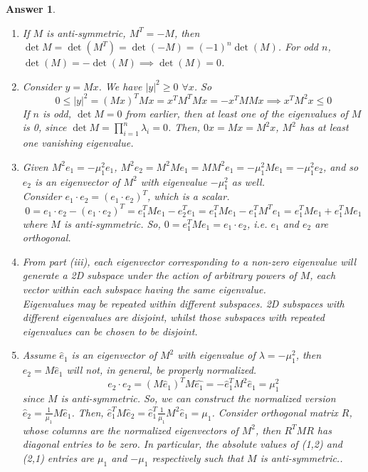 \documentclass[a4paper]{article}
\newtheorem{ans}{Answer}[section]
\theoremstyle{new}
\begin{document}
\begin{ans}\leavevmode
\begin{enumerate}[label=(\roman*)]
\item If $M$ is anti-symmetric, $M^T=-M$, then $\det M=\det(M^T)=\det(-M)=(-1)^n\det(M)$. For odd $n$, $\det(M)=-\det(M)\implies\det(M)=0$.
\item Consider $y=Mx$. We have $|y|^2\geq0$ $\forall x$. So
$$0\leq|y|^2=(Mx)^TMx=x^TM^TMx=-x^TMMx\implies x^TM^2x\leq0$$
If $n$ is odd, $\det M=0$ from earlier, then at least one of the eigenvalues of $M$ is 0, since $\det M=\prod_{i=1}^n\lambda_i=0$. Then, $0x=Mx=M^2x$, $M^2$ has at least one vanishing eigenvalue.
\item Given $M^2e_1=-\mu_1^2e_1$, $M^2e_2=M^2Me_1=MM^2e_1=-\mu_1^2Me_1=-\mu_1^2e_2$, and so $e_2$ is an eigenvector of $M^2$ with eigenvalue $-\mu_1^2$ as well.\\[5pt]
Consider $e_1\cdot e_2=(e_1\cdot e_2)^T$, which is a scalar.
$$0=e_1\cdot e_2-(e_1\cdot e_2)^T=e_1^TMe_1-e_2^Te_1=e_1^TMe_1-e_1^TM^Te_1=e_1^TMe_1+e_1^TMe_1$$
where $M$ is anti-symmetric. So, $0=e_1^TMe_1=e_1\cdot e_2$, i.e. $e_1$ and $e_2$ are orthogonal.
\item From part (iii), each eigenvector corresponding to a non-zero eigenvalue will generate a 2D subspace under the action of arbitrary powers of $M$, each vector within each subspace having the same eigenvalue.\\[5pt]
Eigenvalues may be repeated within different subspaces. 2D subspaces with different eigenvalues are disjoint, whilst those subspaces with repeated eigenvalues can be chosen to be disjoint.
\item Assume $\hat{e}_1$ is an eigenvector of $M^2$ with eigenvalue of $\lambda=-\mu_1^2$, then $e_2=M\hat{e}_1$ will not, in general, be properly normalized.
$$e_2\cdot e_2=(M\hat{e}_1)^TM\hat{e_1}=-\hat{e}_1^TM^2\hat{e}_1=\mu_1^2$$
since $M$ is anti-symmetric. So, we can construct the normalized version $\hat{e}_2=\frac{1}{\mu_1}M\hat{e}_1$. Then, $\hat{e}_1^TM\hat{e}_2=\hat{e}_1^T\frac{1}{\mu_1}M^2\hat{e}_1=\mu_1$. Consider orthogonal matrix $R$, whose columns are the normalized eigenvectors of $M^2$, then $R^TMR$ has diagonal entries to be zero. In particular, the absolute values of (1,2) and (2,1) entries are $\mu_1$ and $-\mu_1$ respectively such that $M$ is anti-symmetric..
\end{enumerate}
\end{ans}
\newpage
\end{document}
